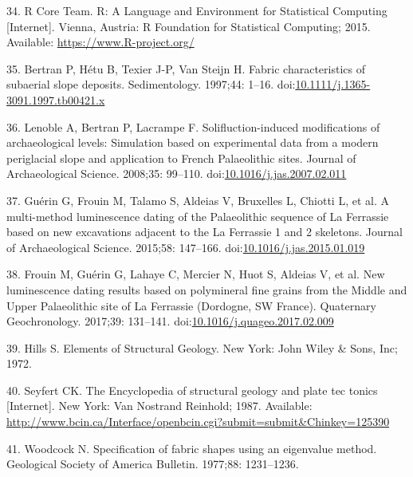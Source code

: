 \documentclass[]{article}
\begin{document}
\hypertarget{ref-r_core_team_r:_2015}{}
34. R Core Team. R: A Language and Environment for Statistical Computing
{[}Internet{]}. Vienna, Austria: R Foundation for Statistical Computing;
2015. Available: \url{https://www.R-project.org/}

\hypertarget{ref-bertran_fabric_1997}{}
35. Bertran P, Hétu B, Texier J-P, Van Steijn H. Fabric characteristics
of subaerial slope deposits. Sedimentology. 1997;44: 1--16.
doi:\href{https://doi.org/10.1111/j.1365-3091.1997.tb00421.x}{10.1111/j.1365-3091.1997.tb00421.x}

\hypertarget{ref-lenoble_solifluction-induced_2008}{}
36. Lenoble A, Bertran P, Lacrampe F. Solifluction-induced modifications
of archaeological levels: Simulation based on experimental data from a
modern periglacial slope and application to French Palaeolithic sites.
Journal of Archaeological Science. 2008;35: 99--110.
doi:\href{https://doi.org/10.1016/j.jas.2007.02.011}{10.1016/j.jas.2007.02.011}

\hypertarget{ref-guerin_multi-method_2015}{}
37. Guérin G, Frouin M, Talamo S, Aldeias V, Bruxelles L, Chiotti L, et
al. A multi-method luminescence dating of the Palaeolithic sequence of
La Ferrassie based on new excavations adjacent to the La Ferrassie 1 and
2 skeletons. Journal of Archaeological Science. 2015;58: 147--166.
doi:\href{https://doi.org/10.1016/j.jas.2015.01.019}{10.1016/j.jas.2015.01.019}

\hypertarget{ref-frouin_new_2017}{}
38. Frouin M, Guérin G, Lahaye C, Mercier N, Huot S, Aldeias V, et al.
New luminescence dating results based on polymineral fine grains from
the Middle and Upper Palaeolithic site of La Ferrassie (Dordogne, SW
France). Quaternary Geochronology. 2017;39: 131--141.
doi:\href{https://doi.org/10.1016/j.quageo.2017.02.009}{10.1016/j.quageo.2017.02.009}

\hypertarget{ref-hills_elements_1972}{}
39. Hills S. Elements of Structural Geology. New York: John Wiley \&
Sons, Inc; 1972.

\hypertarget{ref-seyfert_encyclopedia_1987}{}
40. Seyfert CK. The Encyclopedia of structural geology and plate tec
tonics {[}Internet{]}. New York: Van Nostrand Reinhold; 1987. Available:
\url{http://www.bcin.ca/Interface/openbcin.cgi?submit=submit\&Chinkey=125390}

\hypertarget{ref-woodcock_specification_1977}{}
41. Woodcock N. Specification of fabric shapes using an eigenvalue
method. Geological Society of America Bulletin. 1977;88: 1231--1236.
\end{document}
